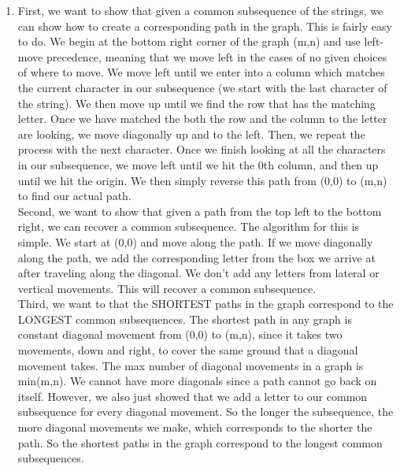 \documentclass[12pt]{article}
\begin{document}
\begin{enumerate}[label=(\alph*)]
    \item First, we want to show that given a common subsequence of the strings, we can show how to create a corresponding path in the graph. This is fairly easy to do. We begin at the bottom right corner of the graph (m,n) and use left-move precedence, meaning that we move left in the cases of no given choices of where to move. We move left until we enter into a column which matches the current character in our subsequence (we start with the last character of the string). We then move up until we find the row that has the matching letter. Once we have matched the both the row and the column to the letter are looking, we move diagonally up and to the left. Then, we repeat the process with the next character. Once we finish looking at all the characters in our subsequence, we move left until we hit the 0th column, and then up until we hit the origin. We then simply reverse this path from (0,0) to (m,n) to find our actual path.\\

    Second, we want to show that given a path from the top left to the bottom right, we can recover a common subsequence. The algorithm for this is simple. We start at (0,0) and move along the path. If we move diagonally along the path, we add the corresponding letter from the box we arrive at after traveling along the diagonal. We don't add any letters from lateral or vertical movements. This will recover a common subsequence.\\

    Third, we want to that the SHORTEST paths in the graph correspond to the LONGEST common subsequences. The shortest path in any graph is constant diagonal movement from (0,0) to (m,n), since it takes two movements, down and right, to cover the same ground that a diagonal movement takes. The max number of diagonal movements in a graph is min(m,n). We cannot have more diagonals since a path cannot go back on itself. However, we also just showed that we add a letter to our common subsequence for every diagonal movement. So the longer the subsequence, the more diagonal movements we make, which corresponds to the shorter the path. So the shortest paths in the graph correspond to the longest common subsequences.\\


\end{enumerate}
\end{document}
